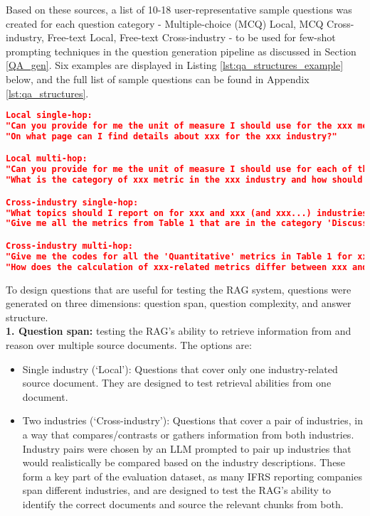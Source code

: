 Based on these sources, a list of 10-18 user-representative sample questions was created for each question category - Multiple-choice (MCQ) Local, MCQ Cross-industry, Free-text Local, Free-text Cross-industry - to be used for few-shot prompting techniques in the question generation pipeline as discussed in Section \ref{QA_gen}. Six examples are displayed in Listing \ref{lst:qa_structures_example} below, and the full list of sample questions can be found in Appendix \ref{lst:qa_structures}.

\begin{lstlisting}[language=JSON,firstnumber=1,label={lst:qa_structures_example},caption={Select user-representative question structures}]
Local single-hop:
"Can you provide for me the unit of measure I should use for the xxx metric in the xxx industry?",
"On what page can I find details about xxx for the xxx industry?"

Local multi-hop:
"Can you provide for me the unit of measure I should use for each of the metrics for 'xxx' topic(s) in the xxx industry?",
"What is the category of xxx metric in the xxx industry and how should this metric be calculated?"

Cross-industry single-hop:
"What topics should I report on for xxx and xxx (and xxx...) industries?",
"Give me all the metrics from Table 1 that are in the category 'Discussion and Analysis' for xxx and xxx (and xxx...) industries."

Cross-industry multi-hop:
"Give me the codes for all the 'Quantitative' metrics in Table 1 for xxx and xxx (and xxx...) industries.",
"How does the calculation of xxx-related metrics differ between xxx and xxx (and xxx...) companies?"
\end{lstlisting}


To design questions that are useful for testing the RAG system, questions were generated on three dimensions: question span, question complexity, and answer structure.\\

\textbf{1. Question span:} testing the RAG's ability to retrieve information from and reason over multiple source documents. The options are:
\begin{itemize}
    \item Single industry (`Local'): Questions that cover only one industry-related source document. They are designed to test retrieval abilities from one document.
    \item Two industries (`Cross-industry'): Questions that cover a pair of industries, in a way that compares/contrasts or gathers information from both industries. Industry pairs were chosen by an LLM prompted to pair up industries that would realistically be compared based on the industry descriptions. These form a key part of the evaluation dataset, as many IFRS reporting companies span different industries, and are designed to test the RAG's ability to identify the correct documents and source the relevant chunks from both.
\end{itemize}


